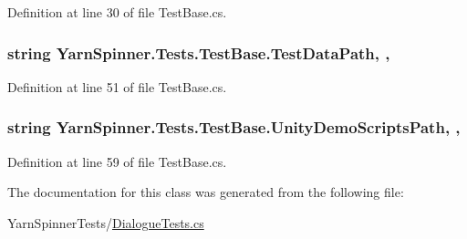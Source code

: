 Definition at line 30 of file Test\-Base.\-cs.

\hypertarget{a00170_aa9b4d902d61adad7165154a265f69aa4}{
\subsubsection[{Test\-Data\-Path}]{\setlength{\rightskip}{0pt plus 5cm}string Yarn\-Spinner.\-Tests.\-Test\-Base.\-Test\-Data\-Path\hspace{0.3cm}{\ttfamily [static]}, {\ttfamily [get]}, {\ttfamily [inherited]}}}\label{a00170_aa9b4d902d61adad7165154a265f69aa4}


Definition at line 51 of file Test\-Base.\-cs.

\hypertarget{a00170_a39922286f6255e4fd0e433a4fc7521c4}{
\subsubsection[{Unity\-Demo\-Scripts\-Path}]{\setlength{\rightskip}{0pt plus 5cm}string Yarn\-Spinner.\-Tests.\-Test\-Base.\-Unity\-Demo\-Scripts\-Path\hspace{0.3cm}{\ttfamily [static]}, {\ttfamily [get]}, {\ttfamily [inherited]}}}\label{a00170_a39922286f6255e4fd0e433a4fc7521c4}


Definition at line 59 of file Test\-Base.\-cs.



The documentation for this class was generated from the following file\-:\begin{DoxyCompactItemize}
\item 
Yarn\-Spinner\-Tests/\hyperlink{a00328}{Dialogue\-Tests.\-cs}\end{DoxyCompactItemize}
